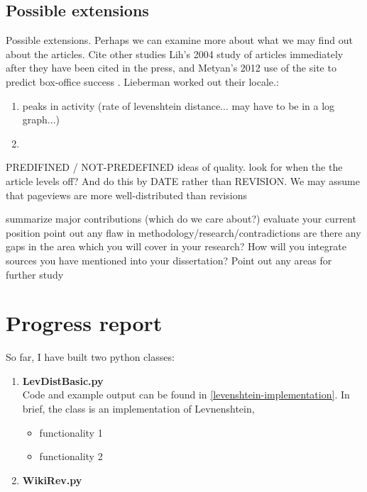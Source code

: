 \documentclass[a4paper,11pt,twoside,notitlepage]{article}
\begin{document}
        \subsection*{Possible extensions}
        Possible extensions.  Perhaps we can examine more about what
        we may find out about the articles. Cite other studies Lih's
        2004 study of articles immediately after they have been cited
        in the press\cite{Lih2004}, and Metyan's 2012 use of the site
        to predict box-office success \cite{Mestyan2012}. Lieberman
        worked out their locale.\cite{Lieberman2009}:

        \begin{enumerate}
          \item peaks in activity (rate of levenshtein distance... may
            have to be in a log graph...)
          \item 
        \end{enumerate}

        PREDIFINED / NOT-PREDEFINED ideas of quality. look for when
        the the article levels off? And do this by DATE rather than
        REVISION. We may assume that pageviews are more
        well-distributed than revisions

        summarize major contributions (which do we care about?)
        evaluate your current position point out any flaw in
        methodology/research/contradictions are there any gaps in the
        area which you will cover in your research?  How will you
        integrate sources you have mentioned into your dissertation?
        Point out any areas for further study


        \section{Progress report}
        So far, I have built two python classes:
        \begin{enumerate}
          \item \textbf{LevDistBasic.py}\\
            Code and example output can be found in
            \cref{levenshtein-implementation}. In brief, the class is
            an implementation of Levnenshtein, 
 
            \begin{itemize}
              \item functionality 1
              \item functionality 2
            \end{itemize}
          \item \textbf{WikiRev.py}
        \end{enumerate}
\end{document}
